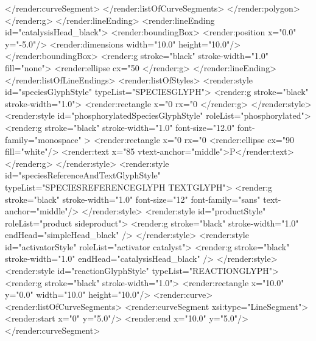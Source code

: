 {\begin{example}
          </render:curveSegment>
         </render:listOfCurveSegments>
        </render:polygon>
       </render:g>
      </render:lineEnding>
      <render:lineEnding id="catalysisHead_black">
       <render:boundingBox>
        <render:position x="0.0" y="-5.0"/>
        <render:dimensions width="10.0" height="10.0"/>
       </render:boundingBox>
       <render:g stroke="black" stroke-width="1.0" fill="none">
        <render:ellipse cx="50%
       </render:g>
      </render:lineEnding>
     </render:listOfLineEndings>
     <render:listOfStyles>
      <render:style id="speciesGlyphStyle" typeList="SPECIESGLYPH">
       <render:g stroke="black" stroke-width="1.0">
        <render:rectangle x="0%
                          rx="0%
       </render:g>
      </render:style>
      <render:style id="phosphorylatedSpeciesGlyphStyle" 
                    roleList="phosphorylated">
       <render:g stroke="black" stroke-width="1.0" font-size="12.0"
                 font-family="monospace" >
        <render:rectangle x="0%
                          rx="0%
        <render:ellipse cx="90%
                        fill="white"/>
        <render:text x="85%
                     vtext-anchor="middle">P</render:text>
       </render:g>
      </render:style>
      <render:style id="speciesReferenceAndTextGlyphStyle" 
                    typeList="SPECIESREFERENCEGLYPH TEXTGLYPH">
       <render:g stroke="black" stroke-width="1.0" font-size="12"
                 font-family="sans" text-anchor="middle"/>
      </render:style>
      <render:style id="productStyle"
                    roleList="product sideproduct">
       <render:g stroke="black" stroke-width="1.0" 
                 endHead="simpleHead_black" />
      </render:style>
      <render:style id="activatorStyle" 
                    roleList="activator catalyst">
       <render:g stroke="black" stroke-width="1.0" 
                 endHead="catalysisHead_black" />
      </render:style>
      <render:style id="reactionGlyphStyle"
                    typeList="REACTIONGLYPH">
       <render:g stroke="black" stroke-width="1.0">
        <render:rectangle x="10.0" y="0.0" 
                          width="10.0" height="10.0"/>
        <render:curve>
         <render:listOfCurveSegments>
          <render:curveSegment xsi:type="LineSegment">
           <render:start x="0" y="5.0"/>
           <render:end x="10.0" y="5.0"/>
          </render:curveSegment>

\end{example}}
